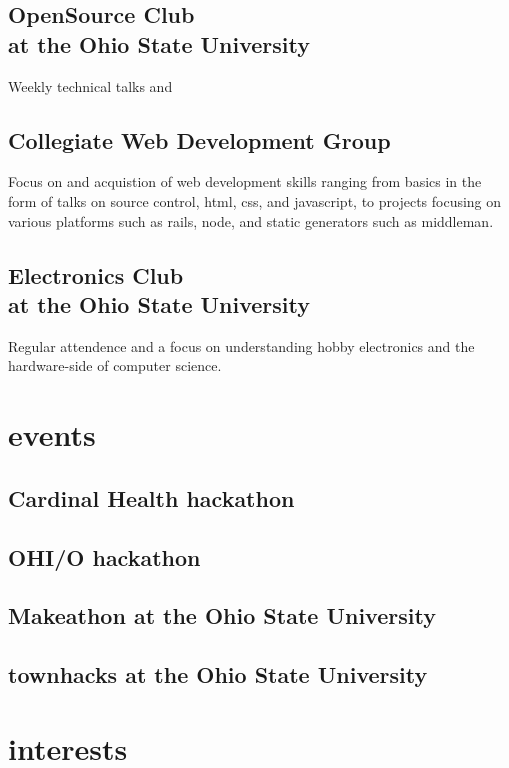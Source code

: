 \documentclass[letterpaper]{cv}
\begin{document}
		\subsection{OpenSource Club\\ at the Ohio State University}
			Weekly technical talks and 

		\subsection{Collegiate Web Development Group}
			Focus on and acquistion of web development skills ranging from basics in the form of talks on source control, html, css, and javascript, to projects focusing on various platforms such as rails, node, and static generators such as middleman.

		\subsection{Electronics Club\\ at the Ohio State University}
			Regular attendence and a focus on understanding hobby electronics and the hardware-side of computer science.

	\section{events}
		\subsection{Cardinal Health hackathon}
			

		\subsection{OHI/O hackathon}
			

		\subsection{Makeathon at the Ohio State University}
			

		\subsection{townhacks at the Ohio State University}
			

	\section{interests}
		
		
\end{document}
